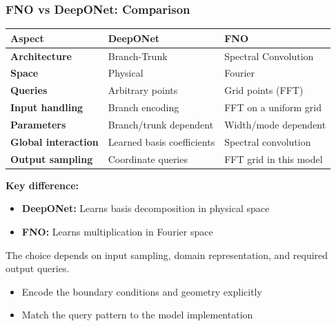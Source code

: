\documentclass{beamer}
\begin{document}
\begin{frame}
\frametitle{FNO vs DeepONet: Comparison}

\begin{table}[]
\small
\begin{tabular}{@{}lll@{}}
\toprule
\textbf{Aspect} & \textbf{DeepONet} & \textbf{FNO} \\ \midrule
\textbf{Architecture} & Branch-Trunk & Spectral Convolution \\
\textbf{Space} & Physical & Fourier \\
\textbf{Queries} & Arbitrary points & Grid points (FFT) \\
\textbf{Input handling} & Branch encoding & FFT on a uniform grid \\
\textbf{Parameters} & Branch/trunk dependent & Width/mode dependent \\
\textbf{Global interaction} & Learned basis coefficients & Spectral convolution \\

\textbf{Output sampling} & Coordinate queries & FFT grid in this model \\ \bottomrule
\end{tabular}
\end{table}

\vspace{0.2cm}

\textbf{Key difference:}
\begin{itemize}
    \item \textbf{DeepONet:} Learns basis decomposition in physical space
    \item \textbf{FNO:} Learns multiplication in Fourier space
\end{itemize}

\vspace{0.2cm}

The choice depends on input sampling, domain representation, and required output queries.
\begin{itemize}
    \item Encode the boundary conditions and geometry explicitly
    \item Match the query pattern to the model implementation
\end{itemize}

\end{frame}
\end{document}
